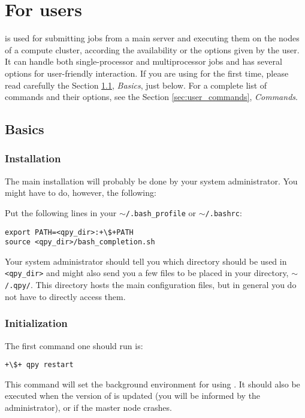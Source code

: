 \documentclass[a4paper,12pt]{article}
\begin{document}


\tableofcontents

\newpage
\section{For users}\label{sec:users}

\qpy{} is used for submitting jobs from a main server and executing them on the nodes of a compute cluster, according the availability or the options given by the user.
It can handle both single-processor and multiprocessor jobs and has several options for user-friendly  interaction.
If you are using \qpy{} for the first time, please read carefully the Section \ref{sec:user_basics}, \emph{Basics}, just below.
For a complete list of commands and their options, see the Section \ref{sec:user_commands}, \emph{Commands}.

\subsection{Basics}\label{sec:user_basics}

\subsubsection{Installation}

The main installation will probably be done by your system administrator.
You might have to do, however, the following:

Put the following lines in your $\sim$\texttt{/.bash\_profile} or $\sim$\texttt{/.bashrc}:
\begin{lstlisting}[style=FileStyle]
export PATH=<qpy_dir>:+\$+PATH
source <qpy_dir>/bash_completion.sh
\end{lstlisting}
Your system administrator should tell you which directory should be used in \texttt{<qpy\_dir>} and
 might also send you a few files to be placed in your \qpy{} directory, $\sim$\texttt{/.qpy/}.
This directory hosts the main configuration files, but in general you do not have to directly access them.

\subsubsection{Initialization}

The first \qpy{} command one should run is:
\begin{lstlisting}[style=BashStyle]
+\$+ qpy restart
\end{lstlisting}
This command will set the background environment for using \qpy{}.
It should also be executed when the version of \qpy{} is updated (you will be informed by the administrator), or if the master node crashes.
\end{document}
